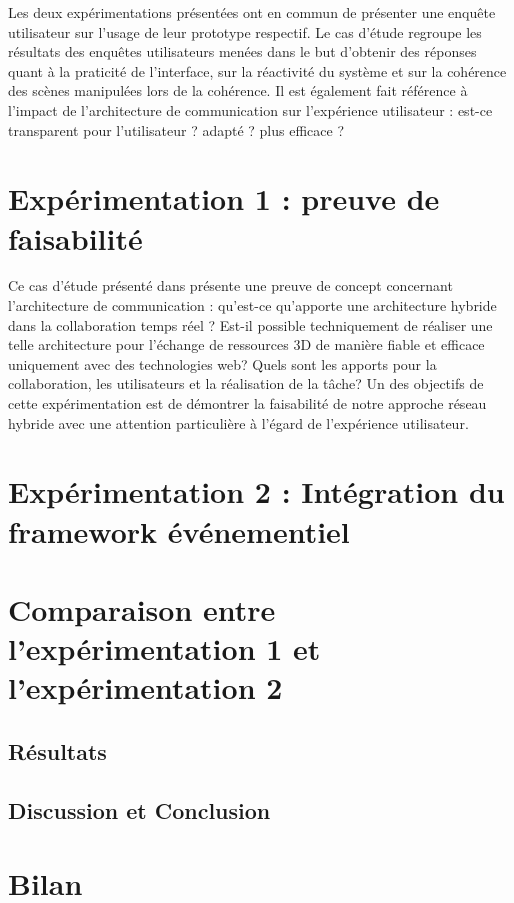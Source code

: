 Les deux expérimentations présentées ont en commun de présenter une enquête 
utilisateur sur l'usage de leur prototype respectif. Le cas d'étude regroupe les 
résultats des enquêtes utilisateurs menées dans le but d'obtenir des réponses 
quant à la praticité de l'interface, sur la réactivité du système et sur la 
cohérence des scènes manipulées lors de la cohérence. Il est également fait 
référence à l'impact de l'architecture de communication sur l'expérience utilisateur 
: est-ce transparent pour l'utilisateur ? adapté ? plus efficace ?




\section{Expérimentation 1 : preuve de faisabilité}

Ce cas d'étude présenté dans \cite{Desprat2015a, Desprat2015b} présente 
une preuve de concept concernant l'architecture de communication : qu'est-ce 
qu'apporte une architecture hybride dans la collaboration temps réel ? Est-il 
possible techniquement de réaliser une 
telle architecture pour l'échange de ressources 3D de manière fiable et efficace 
uniquement avec des technologies web? Quels sont les apports pour la 
collaboration, les utilisateurs et la réalisation de la tâche?
Un des objectifs de cette expérimentation est de démontrer la faisabilité de notre 
approche réseau hybride avec une attention particulière à l'égard de l'expérience 
utilisateur.



\section{Expérimentation 2 : Intégration du framework événementiel}
\label{sec:us}






\section{Comparaison entre l'expérimentation 1 et l'expérimentation 2}
\subsection{Résultats}
\subsection{Discussion et Conclusion}
\section{Bilan}